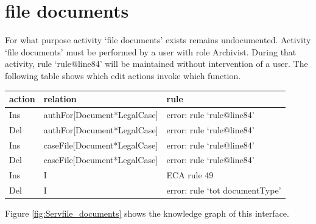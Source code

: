 \documentclass[10pt,a4paper]{report}              %
\theoremstyle{plain}\theorembodyfont{\rmfamily}\newtheorem{definition}{Definition}[section]
\theoremstyle{plain}\theorembodyfont{\rmfamily}\newtheorem{designrule}[definition]{Requirement}
\begin{document}
\chapter{file documents}\label{chpIfcfile documents}

For what purpose activity `file documents' exists remains undocumented.
Activity `file documents'
must be performed by a user with role Archivist.
During that activity, rule `rule@line84'
will be maintained without intervention of a user.
The following table shows which edit actions invoke which function.
\begin{center}
\begin{tabular}{lll}
action & relation & rule\\
\hline
Ins & authFor{[}Document*LegalCase{]} & error: rule `rule@line84'\\
Del & authFor{[}Document*LegalCase{]} & error: rule `rule@line84'\\
Ins & caseFile{[}Document*LegalCase{]} & error: rule `rule@line84'\\
Del & caseFile{[}Document*LegalCase{]} & error: rule `rule@line84'\\
Ins & I & ECA rule 49\\
Del & I & error: rule `tot documentType'\\
\end{tabular}
\end{center}

Figure \ref{fig:Servfile_documents} shows the knowledge graph of this interface.
\end{document}
